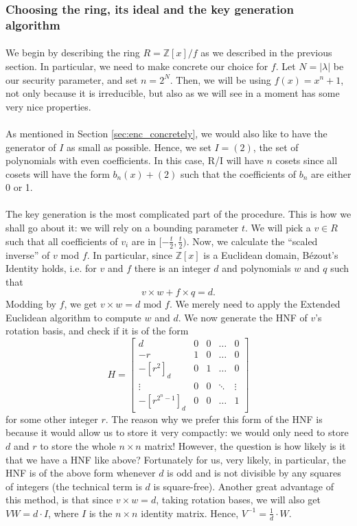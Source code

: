 \documentclass{article}
\theoremstyle{definition}
\theoremstyle{example}
\newcommand{\Int}{\mathbb{Z}}
\renewcommand{\mod}{\,\,\text{mod}\,\,}
\begin{document}
\subsubsection{Choosing the ring, its ideal and the key generation algorithm}
\paragraph{} We begin by describing the ring $R = \Int[x]/f$ as we described in the previous
section. In particular, we need to make concrete our choice for $f$. Let $N =
|\lambda| $ be our security parameter, and set $n = 2^N$. Then, we will be
using $f(x) = x^n + 1$, not only because it is irreducible, but also as we
will see in a moment has some very nice properties. 
\paragraph{} As mentioned in Section \ref{sec:enc_concretely}, we would also
like to have the generator of $I$ as small as possible. Hence, we set $I = (2)$,
the set of polynomials with even coefficients. In this case, R/I will have $n$
cosets since all cosets will have the form $b_n(x) + (2)$ such that the
coefficients of $b_n$ are either 0 or 1.
\paragraph{} The key generation is the most complicated part of the procedure.
This is how we shall go about it: we will rely on a bounding parameter $t$. We
will pick a $v \in R$ such that all coefficients of $v_i$ are in $[-\frac{t}2,
\frac{t}2)$. Now, we calculate the ``scaled inverse'' of $v$ mod $f$. In
particular, since $\Int[x]$ is a Euclidean domain, B\'ezout's Identity holds,
i.e. for $v$ and $f$ there is an integer $d$ and polynomials $w$ and $q$ such
that
\[
  v\times w + f \times q = d.
\]
Modding by $f$, we get $v\times w = d \mod f$. We merely need to apply the
Extended Euclidean algorithm to compute $w$ and $d$.
We now generate the HNF of $v$'s rotation basis, and check if it is of the form 
\[
  H = \begin{bmatrix}
    d & 0 & 0 &\hdots &0 \\
    -r & 1 & 0 &\hdots &0 \\
    -[r^2]_d & 0 & 1 & \hdots& 0 \\
    \vdots & 0 & 0 & \ddots & \vdots \\
    -[r^{2^n - 1}]_d & 0 & 0 & \hdots & 1
  \end{bmatrix}
\]
for some other integer $r$. The reason why we prefer this form of the HNF is
because it would allow us to store it very compactly: we would only need to
store $d$ and $r$ to store the whole $n \times n$ matrix! However, the
question is how likely is it that we have a HNF like above? Fortunately for us,
very likely, in particular, the HNF is of the above form whenever $d$ is odd and
is not divisible by any squares of integers (the technical term is $d$ is
square-free). Another great advantage of this method, is that since $v \times w
= d$, taking rotation bases, we will also get $VW = d\cdot I$, where $I$ is the
$n\times n$ identity matrix. Hence, $V^{-1} = \frac1d \cdot W$. 
\end{document}
